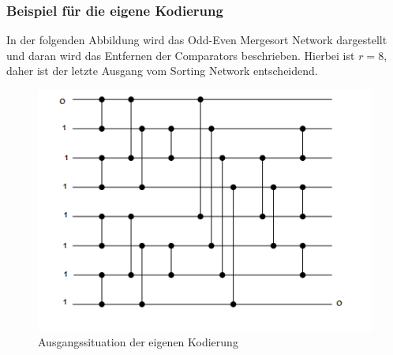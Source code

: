 \documentclass[a4,abstract=on]{scrartcl}
\begin{document}

\subsubsection*{Beispiel für die eigene Kodierung}
In der folgenden Abbildung wird das Odd-Even Mergesort Network dargestellt und daran wird das Entfernen der Comparators beschrieben. Hierbei ist $r=8$, daher ist der letzte Ausgang vom Sorting Network entscheidend.

\begin{figure}[H]
\centering
\includegraphics[width=\textwidth]{ownSorting_start.png}
\caption{Ausgangssituation der eigenen Kodierung}
\label{fig:ownSorting}
\end{figure}
\end{document}
